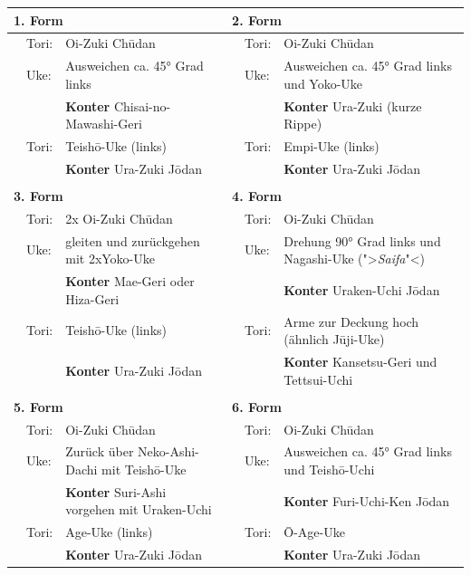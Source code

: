 \documentclass[a5paper,landscape,DIV=calc,11pt,notitlepage]{scrartcl}
\begin{document}
\pagebreak
\begin{tcolorbox}[colback=white,colframe=GKD,coltitle=white,adjusted title=Kurzbeschreibung Kumite-Ura 1..6]
	\null\vfill\null	
	{\small 	
		\begin{tabularx}{\textwidth}{lllllX}
			\multicolumn{3}{l}{\textbf{1. Form}}&\multicolumn{3}{l}{\textbf{2. Form}}\\
			\midrule
			&Tori:	& Oi-Zuki Ch\={u}dan						&&Tori:	& Oi-Zuki Ch\={u}dan\\
			&Uke:	& Ausweichen ca. 45° Grad links				&&Uke:	& Ausweichen ca. 45° Grad links und Yoko-Uke\\
			&		& \textbf{Konter} Chisai-no-Mawashi-Geri	&&		& \textbf{Konter} Ura-Zuki (kurze Rippe)\\
			&Tori:	& Teish\={o}-Uke (links)						&&Tori:	& Empi-Uke (links)\\
			&		& \textbf{Konter} Ura-Zuki J\={o}dan		&&		& \textbf{Konter} Ura-Zuki J\={o}dan\\
			\midrule&&&&&\\
			\multicolumn{3}{l}{\textbf{3. Form}}&\multicolumn{3}{l}{\textbf{4. Form}}\\
			\midrule
			&Tori:	& 2x Oi-Zuki Ch\={u}dan						&&Tori:	& Oi-Zuki Ch\={u}dan\\
			&Uke:	& gleiten und zurückgehen mit 2xYoko-Uke	&&Uke:	& Drehung 90° Grad links und Nagashi-Uke (">\textit{Saifa}"<)\\
			&		& \textbf{Konter} Mae-Geri oder Hiza-Geri	&&		& \textbf{Konter} Uraken-Uchi J\={o}dan\\
			&Tori:	& Teish\={o}-Uke (links)						&&Tori:	& Arme zur Deckung hoch (ähnlich J\={u}ji-Uke)\\
			&		& \textbf{Konter} Ura-Zuki J\={o}dan		&&		& \textbf{Konter} Kansetsu-Geri und Tettsui-Uchi\\
			\midrule&&&&&\\
			\multicolumn{3}{l}{\textbf{5. Form}}&\multicolumn{3}{l}{\textbf{6. Form}}\\
			\midrule
			&Tori:	& Oi-Zuki Ch\={u}dan						&&Tori:	& Oi-Zuki Ch\={u}dan\\
			&Uke:	& Zurück über Neko-Ashi-Dachi mit Teish\={o}-Uke&&Uke:	& Ausweichen ca. 45° Grad links und Teish\={o}-Uchi\\
			&		& \textbf{Konter} Suri-Ashi vorgehen mit Uraken-Uchi	
																&&		& \textbf{Konter} Furi-Uchi-Ken J\={o}dan\\
			&Tori:	& Age-Uke (links)							&&Tori:	& \={O}-Age-Uke\\
			&		& \textbf{Konter} Ura-Zuki J\={o}dan		&&		& \textbf{Konter} Ura-Zuki J\={o}dan\\
			\midrule
		\end{tabularx}
	}\null\vfill\null
\end{tcolorbox}
\end{document}
